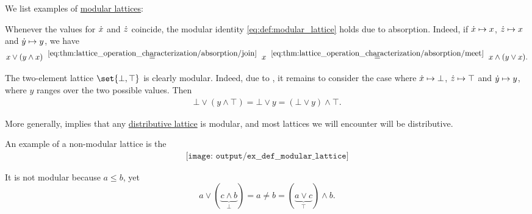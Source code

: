 \begin{example}\label{ex:def:modular_lattice}
  We list examples of \hyperref[def:modular_lattice]{modular lattices}:
  \begin{thmenum}
     Whenever the values for \( {\dot{x}} \) and \( {\dot{z}} \) coincide, the modular identity \eqref{eq:def:modular_lattice} holds due to absorption. Indeed, if \( {\dot{x}} \mapsto x \), \( {\dot{z}} \mapsto x \) and \( {\dot{y}} \mapsto y \), we have
    \begin{equation*}
      x \vee (y \wedge x)
      \reloset {\eqref{eq:thm:lattice_operation_characterization/absorption/join}} =
      x
      \reloset {\eqref{eq:thm:lattice_operation_characterization/absorption/meet}} =
      x \wedge (y \vee x).
    \end{equation*}

     The two-element lattice \( \set{ \bot, \top } \) is clearly modular. Indeed, due to , it remains to consider the case where \( {\dot{x}} \mapsto \bot \), \( {\dot{z}} \mapsto \top \) and \( {\dot{y}} \mapsto y \), where \( y \) ranges over the two possible values. Then
    \begin{align*}
      \bot \vee (y \wedge \top)
      =
      \bot \vee y
      =
      (\bot \vee y) \wedge \top.
    \end{align*}

    More generally,  implies that any \hyperref[def:distributive_lattice]{distributive lattice} is modular, and most lattices we will encounter will be distributive.

     An example of a non-modular lattice is the 
    \begin{equation}\label{eq:ex:def:modular_lattice/pentagon}\tag{\( N_5 \)}
      \begin{aligned}
        \texttt{[image: output/ex\_\_def\_\_modular\_lattice]}
      \end{aligned}
    \end{equation}

    It is not modular because \( a \leq b \), yet
    \begin{equation*}
      a \vee (\underbrace{c \wedge b}_{\bot})
      =
      a
      \neq
      b
      =
      (\underbrace{a \vee c}_{\top}) \wedge b.
    \end{equation*}
  \end{thmenum}
\end{example}

